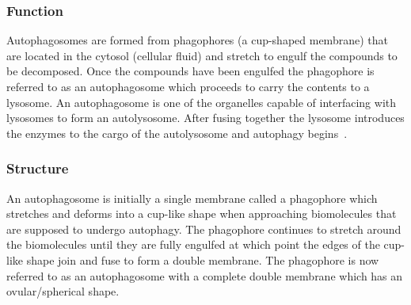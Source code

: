 \subsubsection*{Function}
Autophagosomes are formed from phagophores (a cup-shaped membrane) that are located in the cytosol (cellular fluid) and stretch to engulf the compounds to be decomposed. Once the compounds have been engulfed the phagophore is referred to as an autophagosome which proceeds to carry the contents to a lysosome. An autophagosome is one of the organelles capable of interfacing with lysosomes to form an autolysosome. After fusing together the lysosome introduces the enzymes to the cargo of the autolysosome and autophagy begins~\cite{lyso_auto_relation}.
\subsubsection*{Structure}
An autophagosome is initially a single membrane called a phagophore which stretches and deforms into a cup-like shape when approaching biomolecules that are supposed to undergo autophagy. The phagophore continues to stretch around the biomolecules until they are fully engulfed at which point the edges of the cup-like shape join and fuse to form a double membrane. The phagophore is now referred to as an autophagosome with a complete double membrane which has an ovular/spherical shape.

